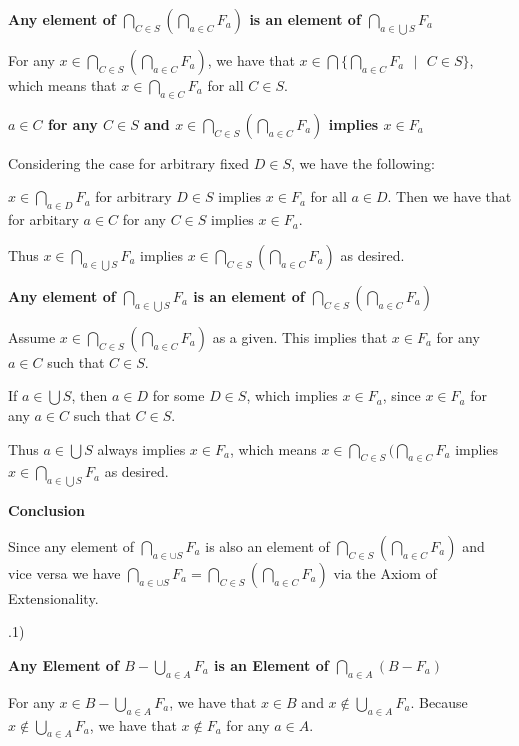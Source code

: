 \documentclass{article}
\begin{document}
\medskip
\textbf{Any element of $\bigcap_{C \in S}(\bigcap_{a \in C} F_a)$ is an element of $\bigcap_{a \in \bigcup S} F_a$}
\medskip

For any $x \in \bigcap_{C \in S}(\bigcap_{a \in C}F_a)$, we have that $x \in \bigcap\{\bigcap_{a \in C} F_a \text{ } | \text{ } C \in S\}$, which means that $x \in \bigcap_{a \in C} F_a$ for all $C \in S$.

\medskip
\textbf{$a \in C$ for any $C \in S$ and $x \in \bigcap_{C \in S}(\bigcap_{a \in C}F_a)$ implies $x \in F_a$}
\medskip

Considering the case for arbitrary fixed $D \in S$, we have the following:

\medskip

$x \in \bigcap_{a \in D} F_a$ for arbitrary $D \in S$ implies $x \in F_a$ for all $a \in D$. Then we have that for arbitary $a \in C$ for any $C \in S$ implies $x \in F_a$.

\medskip
Thus $x \in \bigcap_{a \in \bigcup S}F_a$ implies $x \in \bigcap_{C \in S}(\bigcap_{a \in C}F_a)$ as desired.

\medskip
\textbf{Any element of $\bigcap_{a \in \bigcup S} F_a$ is an element of $\bigcap_{C \in S}(\bigcap_{a \in C} F_a)$}
\medskip

Assume $x \in \bigcap_{C \in S}(\bigcap_{a \in C}F_a)$ as a given.
This implies that $x \in F_a$ for any $a \in C$ such that $C \in S$.

\medskip
If $a \in \bigcup S$, then $a \in D$ for some $D \in S$, which implies $x \in F_a$, since $x \in F_a$ for any $a \in C$ such that $C \in S$.

\medskip
Thus $a \in \bigcup S$ always implies $x \in F_a$, which means $x \in \bigcap_{C \in S}(\bigcap_{a \in C} F_a$ implies $x \in \bigcap_{a \in \bigcup S}F_a$ as desired.

\medskip
\textbf{Conclusion}
\medskip

Since any element of $\bigcap_{a \in \cup S} F_a$ is also an element of $\bigcap_{C \in S}(\bigcap_{a \in C}F_a)$ and vice versa we have $\bigcap_{a \in \cup S} F_a = \bigcap_{C \in S}(\bigcap_{a \in C}F_a)$ via the Axiom of Extensionality.

.1)

\medskip
\textbf{Any Element of $B - \bigcup_{a \in A}F_a$ is an Element of $\bigcap_{a \in A}(B - F_a)$}
\medskip

For any $x \in B - \bigcup_{a \in A}F_a$, we have that $x \in B$ and $x \notin \bigcup_{a \in A}F_a$. Because $x \notin \bigcup_{a \in A}F_a$, we have that $x \notin F_a$ for any $a \in A$.
\end{document}
